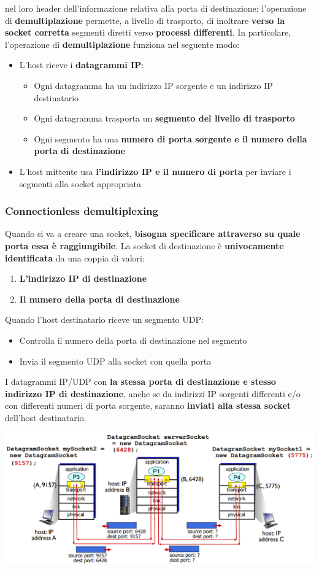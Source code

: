 \documentclass[12pt]{article}
\begin{document}
nel loro header dell'informazione relativa alla porta di destinazione; l'operazione di \textbf{demultiplazione} permette, a livello di trasporto, di inoltrare \textbf{verso la socket corretta} segmenti diretti verso \textbf{processi differenti}.
In particolare, l'operazione di \textbf{demultiplazione} funziona nel seguente modo:
\begin{itemize}
    \item L'host riceve i \textbf{datagrammi IP}:
    \begin{itemize}
        \item Ogni datagramma ha un indirizzo IP sorgente e un indirizzo IP destinatario
        \item Ogni datagramma trasporta un \textbf{segmento del livello di trasporto}
        \item Ogni segmento ha una \textbf{numero di porta sorgente e il numero della porta di destinazione}
    \end{itemize}
    \item L'host mittente usa \textbf{l'indirizzo IP e il numero di porta} per inviare i segmenti alla socket appropriata
\end{itemize}
\subsubsection{Connectionless demultiplexing}
Quando si va a creare una socket, \textbf{bisogna specificare attraverso su quale porta essa è raggiungibile}.
La socket di destinazione è \textbf{univocamente identificata} da una coppia di valori:
\begin{enumerate}
    \item \textbf{L'indirizzo IP di destinazione}
    \item \textbf{Il numero della porta di destinazione}
\end{enumerate}
Quando l'host destinatario riceve un segmento UDP:
\begin{itemize}
    \item Controlla il numero della porta di destinazione nel segmento
    \item Invia il segmento UDP alla socket con quella porta
\end{itemize}
I datagrammi IP/UDP con \textbf{la stessa porta di destinazione e stesso indirizzo IP di destinazione}, anche se da indirizzi IP sorgenti differenti e/o con differenti numeri di porta sorgente, saranno
\textbf{inviati alla stessa socket} dell'host destinatario.
\begin{center}
    \includegraphics[width = 0.90\linewidth]{Images/41.png}
\end{center}
\end{document}
